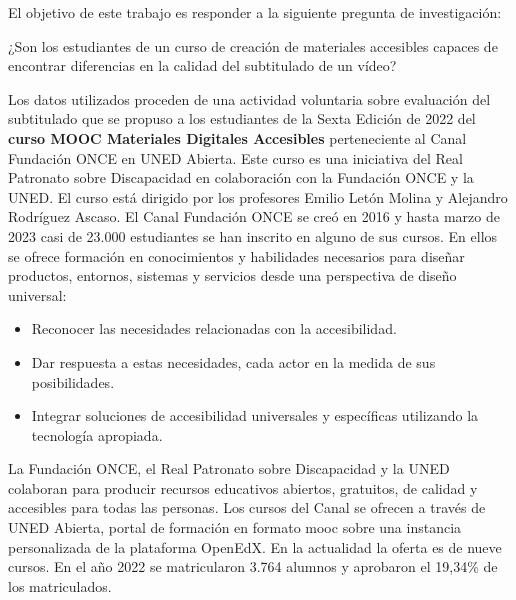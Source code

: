 \documentclass[
  12pt,
  a4paper,
  extrafontsizes,
  onecolumn,
  openright,
  table]{memoir}
\providecommand{\tightlist}{%
  \setlength{\itemsep}{0pt}\setlength{\parskip}{0pt}}\usepackage{longtable,booktabs,array}
\begin{document}
El objetivo de este trabajo es responder a la siguiente pregunta de
investigación:

\begin{tcolorbox}[enhanced jigsaw, colback=white, toptitle=1mm, opacityback=0, title=\textcolor{quarto-callout-note-color}{\faInfo}\hspace{0.5em}{Pregunta de investigación}, coltitle=black, bottomrule=.15mm, bottomtitle=1mm, colbacktitle=quarto-callout-note-color!10!white, toprule=.15mm, titlerule=0mm, left=2mm, breakable, colframe=quarto-callout-note-color-frame, rightrule=.15mm, arc=.35mm, opacitybacktitle=0.6, leftrule=.75mm]

¿Son los estudiantes de un curso de creación de materiales accesibles
capaces de encontrar diferencias en la calidad del subtitulado de un
vídeo?

\end{tcolorbox}

Los datos utilizados proceden de una actividad voluntaria sobre
evaluación del subtitulado que se propuso a los estudiantes de la Sexta
Edición de 2022 del \textbf{curso MOOC Materiales Digitales Accesibles}
perteneciente al Canal Fundación ONCE en UNED Abierta. Este curso es una
iniciativa del Real Patronato sobre Discapacidad en colaboración con la
Fundación ONCE y la UNED. El curso está dirigido por los profesores
Emilio Letón Molina y Alejandro Rodríguez Ascaso. El Canal Fundación
ONCE se creó en 2016 y hasta marzo de 2023 casi de 23.000 estudiantes se
han inscrito en alguno de sus cursos. En ellos se ofrece formación en
conocimientos y habilidades necesarios para diseñar productos, entornos,
sistemas y servicios desde una perspectiva de diseño universal:

\begin{itemize}
\tightlist
\item
  Reconocer las necesidades relacionadas con la accesibilidad.
\item
  Dar respuesta a estas necesidades, cada actor en la medida de sus
  posibilidades.
\item
  Integrar soluciones de accesibilidad universales y específicas
  utilizando la tecnología apropiada.
\end{itemize}

La Fundación ONCE, el Real Patronato sobre Discapacidad y la UNED
colaboran para producir recursos educativos abiertos, gratuitos, de
calidad y accesibles para todas las personas. Los cursos del Canal se
ofrecen a través de UNED Abierta, portal de formación en formato
\gls{mooc} sobre una instancia personalizada de la plataforma OpenEdX.
En la actualidad la oferta es de nueve cursos. En el año 2022 se
matricularon 3.764 alumnos y aprobaron el 19,34\% de los matriculados.
\end{document}

